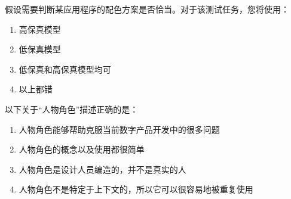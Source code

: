 \begin{problem}
	假设需要判断某应用程序的配色方案是否恰当。对于该测试任务，您将使用：  
    \vspace{-0.8em}
    \begin{multicols}{2}
        \begin{enumerate}[label=\Alph*.]
            \item 高保真模型
            \item 低保真模型
            \item 低保真和高保真模型均可
            \item 以上都错
        \end{enumerate}
    \end{multicols}
    \vspace{-1em}
\end{problem}



\begin{problem}
	以下关于“人物角色”描述正确的是：
        \begin{enumerate}[label=\Alph*.]
            \item 人物角色能够帮助克服当前数字产品开发中的很多问题
            \item 人物角色的概念以及使用都很简单
            \item 人物角色是设计人员编造的，并不是真实的人
            \item 人物角色不是特定于上下文的，所以它可以很容易地被重复使用
        \end{enumerate}
\end{problem}

